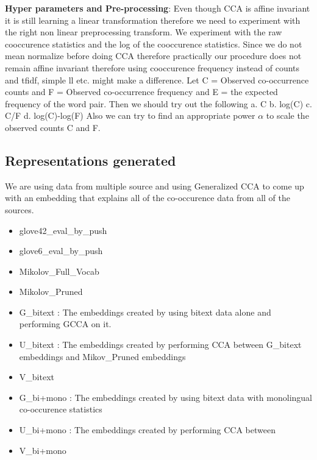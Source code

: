 \documentclass[11pt]{article}
\begin{document}
\textbf{Hyper parameters and Pre-processing}: Even though CCA is
affine invariant it is still learning a linear transformation
therefore we need to experiment with the right non linear
preprocessing transform. We experiment with the raw cooccurence
statistics and the log of the cooccurence statistics. Since we do not
mean normalize before doing CCA therefore practically our procedure
does not remain affine invariant therefore using cooccurence frequency
instead of counts and tfidf, simple ll etc. might make a difference.
Let C = Observed co-occurrence counts
and F = Observed co-occurrence frequency
and E =  the expected frequency of the word pair.
Then we should try out the following
a. C
b. log(C)
c. C/F
d. log(C)-log(F)
Also we can try to find an appropriate power $\alpha$ to scale the
observed counts C and F.

\subsection{Representations generated}
We are using data from multiple source and using Generalized CCA to come up with an embedding that explains all of the co-occurence data from all of the sources. 

\begin{itemize}[noitemsep]
  \item glove42\_eval\_by\_push
\item glove6\_eval\_by\_push
\item Mikolov\_Full\_Vocab
\item Mikolov\_Pruned
\item G\_bitext : The embeddings created by using bitext data alone and performing GCCA on it.
\item U\_bitext : The embeddings created by performing CCA between G\_bitext embeddings and Mikov\_Pruned embeddings
\item V\_bitext
\item G\_bi+mono : The embeddings created by using bitext data with monolingual co-occurence statistics
\item U\_bi+mono : The embeddings created by performing CCA between 
\item V\_bi+mono
\end{itemize}
\end{document}

